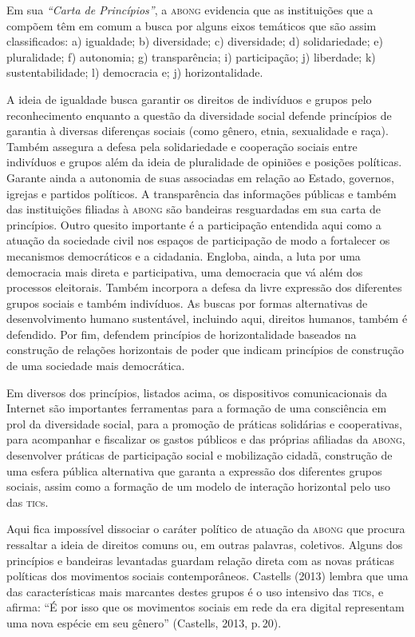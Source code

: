 Em sua \emph{``Carta de Princípios''}, a \textsc{abong} evidencia que as
instituições que a compõem têm em comum a busca por alguns eixos
temáticos que são assim classificados: a) igualdade; b) diversidade; c)
diversidade; d) solidariedade; e) pluralidade; f) autonomia; g)
transparência; i) participação; j) liberdade; k) sustentabilidade; l)
democracia e; j) horizontalidade.

A ideia de igualdade busca garantir os direitos de indivíduos e grupos
pelo reconhecimento enquanto a questão da diversidade social defende
princípios de garantia à diversas diferenças sociais (como gênero,
etnia, sexualidade e raça). Também assegura a defesa pela solidariedade
e cooperação sociais entre indivíduos e grupos além da ideia de
pluralidade de opiniões e posições políticas. Garante ainda a autonomia
de suas associadas em relação ao Estado, governos, igrejas e partidos
políticos. A transparência das informações públicas e também das
instituições filiadas à \textsc{abong} são bandeiras resguardadas em sua carta de
princípios. Outro quesito importante é a participação entendida aqui
como a atuação da sociedade civil nos espaços de participação de modo a
fortalecer os mecanismos democráticos e a cidadania. Engloba, ainda, a
luta por uma democracia mais direta e participativa, uma democracia que
vá além dos processos eleitorais. Também incorpora a defesa da livre
expressão dos diferentes grupos sociais e também indivíduos. As buscas
por formas alternativas de desenvolvimento humano sustentável, incluindo
aqui, direitos humanos, também é defendido. Por fim, defendem princípios
de horizontalidade baseados na construção de relações horizontais de
poder que indicam princípios de construção de uma sociedade mais
democrática.

Em diversos dos princípios, listados acima, os dispositivos
comunicacionais da Internet são importantes ferramentas para a formação
de uma consciência em prol da diversidade social, para a promoção de
práticas solidárias e cooperativas, para acompanhar e fiscalizar os
gastos públicos e das próprias afiliadas da \textsc{abong}, desenvolver práticas
de participação social e mobilização cidadã, construção de uma esfera
pública alternativa que garanta a expressão dos diferentes grupos
sociais, assim como a formação de um modelo de interação horizontal pelo
uso das \textsc{tic}s.

Aqui fica impossível dissociar o caráter político de atuação da \textsc{abong}
que procura ressaltar a ideia de direitos comuns ou, em outras palavras,
coletivos. Alguns dos princípios e bandeiras levantadas guardam relação
direta com as novas práticas políticas dos movimentos sociais
contemporâneos. Castells (2013) lembra que uma das características mais
marcantes destes grupos é o uso intensivo das \textsc{tic}s, e afirma: ``É por
isso que os movimentos sociais em rede da era digital representam uma
nova espécie em seu gênero'' (Castells, 2013, p.\,20).


